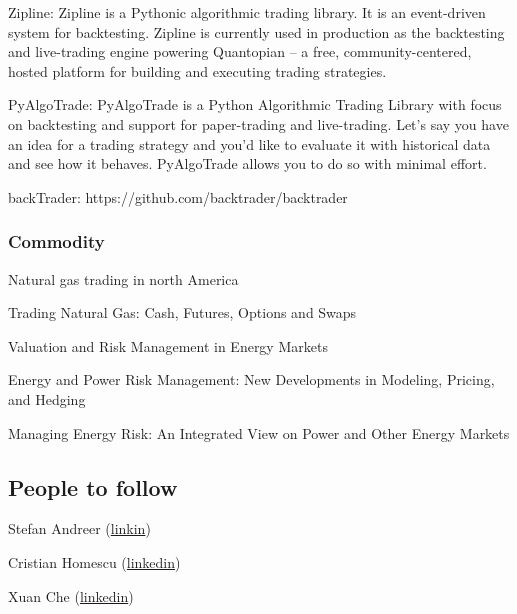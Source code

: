 \begin{refsection}
Zipline: Zipline is a Pythonic algorithmic trading library. It is an event-driven system for backtesting. Zipline is currently used in production as the backtesting and live-trading engine powering Quantopian – a free, community-centered, hosted platform for building and executing trading strategies.

PyAlgoTrade: PyAlgoTrade is a Python Algorithmic Trading Library with focus on backtesting and support for paper-trading and live-trading. Let’s say you have an idea for a trading strategy and you’d like to evaluate it with historical data and see how it behaves. PyAlgoTrade allows you to do so with minimal effort.

backTrader: https://github.com/backtrader/backtrader

\subsubsection{Commodity}

Natural gas trading in north America

Trading Natural Gas: Cash, Futures, Options and
Swaps

Valuation and Risk Management in Energy Markets

Energy and Power Risk Management: New Developments in Modeling, Pricing, and Hedging

Managing Energy Risk: An Integrated View on Power and Other Energy Markets
\subsection{People to follow}

Stefan Andreer (\href{https://www.linkedin.com/in/stefan-andreev-7b136332/}{linkin})

Cristian Homescu (\href{https://www.linkedin.com/in/cristianhomescu/}{linkedin})


Xuan Che (\href{https://www.linkedin.com/in/xuan-che-51260b136/}{linkedin})




\printbibliography



\end{refsection}
















